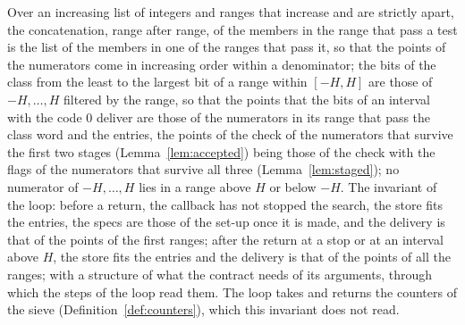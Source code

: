 \begin{lemma}\label{lem:siftIntervals}
  \leanok
  Over an increasing list of integers and ranges that increase and are strictly apart, the
  concatenation, range after range, of the members in the range that pass a test is the list of the
  members in one of the ranges that pass it, so that the points of the numerators come in increasing
  order within a denominator; the bits of the class from the least to the largest bit of a range
  within $[-H, H]$ are those of $-H, \dots, H$ filtered by the range, so that the points that the
  bits of an interval with the code $0$ deliver are those of the numerators in its range that pass
  the class word and the entries, the points of the check of the numerators that survive the first
  two stages (Lemma~\ref{lem:accepted}) being those of the check with the flags of the numerators
  that survive all three (Lemma~\ref{lem:staged}); no numerator of $-H, \dots, H$ lies in a range
  above $H$ or below $-H$. The invariant of the loop: before a return, the callback has not stopped
  the search, the store fits the entries, the specs are those of the set-up once it is made, and the
  delivery is that of the points of the first ranges; after the return at a stop or at an interval
  above $H$, the store fits the entries and the delivery is that of the points of all the ranges;
  with a structure of what the contract needs of its arguments, through which the steps of the loop
  read them. The loop takes and returns the counters of the sieve (Definition~\ref{def:counters}),
  which this invariant does not read.
\end{lemma}

